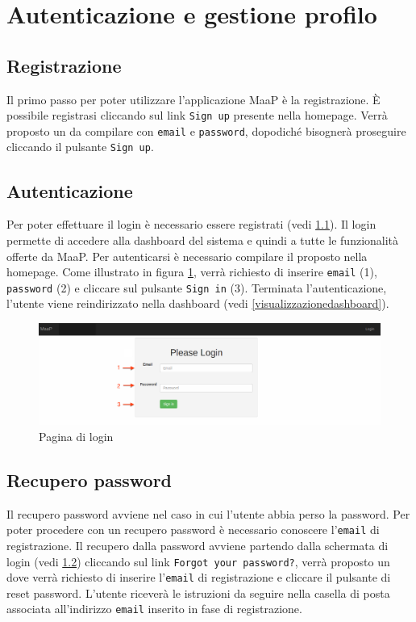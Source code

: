 \section{Autenticazione e gestione profilo}

	\subsection{Registrazione}
	\label{registrazione}

	Il primo passo per poter utilizzare l'applicazione MaaP è la registrazione. \`E possibile registrasi cliccando sul link \texttt{Sign up} presente nella homepage. Verrà proposto un  da compilare con \texttt{email} e \texttt{password}, dopodiché bisognerà proseguire cliccando il pulsante \texttt{Sign up}.

	\subsection{Autenticazione}
	\label{autenticazione}
	Per poter effettuare il login è necessario essere registrati (vedi \ref{registrazione}). Il login permette di accedere alla dashboard del sistema e quindi a tutte le funzionalità offerte da MaaP. Per autenticarsi è necessario compilare il  proposto nella homepage. Come illustrato in figura \ref{fig:login}, verrà richiesto di inserire \texttt{email} (1), \texttt{password} (2) e cliccare sul pulsante \texttt{Sign in} (3). Terminata l'autenticazione, l'utente viene reindirizzato nella dashboard (vedi \ref{visualizzazionedashboard}).

	\begin{figure}[H]
	\label{fig:login}
		\centering \includegraphics[width=1\textwidth]{img/login.png}
	\caption{Pagina di login}
	\end{figure}

	\subsection{Recupero password}
	\label{recuperopassword}
	Il recupero password avviene nel caso in cui l'utente abbia perso la password. Per poter procedere con un recupero password è necessario conoscere l'\texttt{email} di registrazione. Il recupero dalla password avviene partendo dalla schermata di login (vedi \ref{autenticazione}) cliccando sul link \texttt{Forgot your password?}, verrà proposto un  dove verrà richiesto di inserire l'\texttt{email} di registrazione e cliccare il pulsante di reset password. L'utente riceverà le istruzioni da seguire nella casella di posta associata all'indirizzo \texttt{email} inserito in fase di registrazione.


